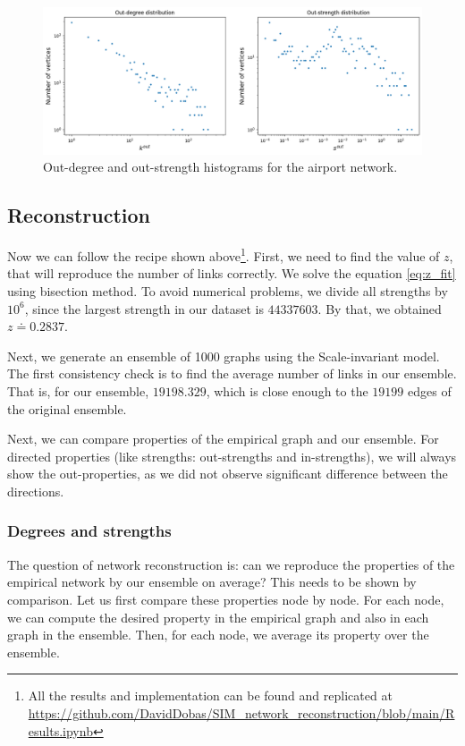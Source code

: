 \begin{figure}[!ht]
    \centering
    \includegraphics[scale=0.5]{../img/vanilla_SIM/deg_strengths.png}
    \caption{Out-degree and out-strength histograms for the airport network.}
    \label{fig:deg_strengths}
\end{figure}

\subsection{Reconstruction}
Now we can follow the recipe shown above\footnote{All the results and implementation can be found and replicated at \href{https://github.com/DavidDobas/SIM\_network\_reconstruction/blob/main/Results.ipynb}{https://github.com/DavidDobas/SIM\_network\_reconstruction/blob/main/Results.ipynb}}. First, we need to find the value of $z$, that will reproduce the number of links correctly. We solve the equation \ref{eq:z_fit} using bisection method. To avoid numerical problems, we divide all strengths by $10^6$, since the largest strength in our dataset is $44\mathpunct{}337\mathpunct{}603$. By that, we obtained $z \doteq 0.2837$.

Next, we generate an ensemble of 1000 graphs using the Scale-invariant model. The first consistency check is to find the average number of links in our ensemble. That is, for our ensemble, $19\mathpunct{}198.329$, which is close enough to the $19\mathpunct{}199$ edges of the original ensemble.

Next, we can compare properties of the empirical graph and our ensemble. For directed properties (like strengths: out-strengths and in-strengths), we will always show the out-properties, as we did not observe significant difference between the directions.

\subsubsection{Degrees and strengths}
The question of network reconstruction is: can we reproduce the properties of the empirical network by our ensemble on average? This needs to be shown by comparison. Let us first compare these properties node by node. For each node, we can compute the desired property in the empirical graph and also in each graph in the ensemble. Then, for each node, we average its property over the ensemble. 

